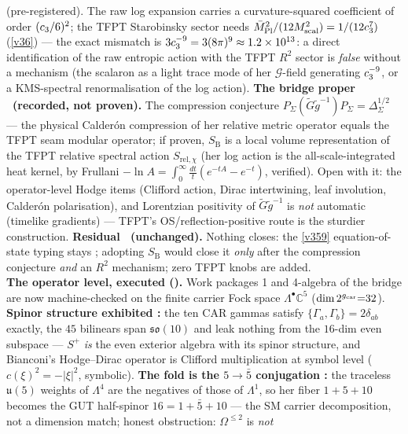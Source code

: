 \begin{keybox}
{(pre-registered).} The raw log expansion carries a curvature-squared coefficient of order
$(c_3/6)^2$; the TFPT Starobinsky sector needs $\bar M_{\mathrm{Pl}}^2/(12M_{\mathrm{scal}}^2)=1/(12c_3^7)$
(\vref{v36}) --- the exact mismatch is $3c_3^{-9}=3(8\pi)^9\approx1.2\times10^{13}$: a direct
identification of the raw entropic action with the TFPT $R^2$ sector is \emph{false} without a mechanism
(the scalaron as a light trace mode of her $\mathcal G$-field generating $c_3^{-9}$, or a KMS-spectral
renormalisation of the log action). \textbf{The bridge proper \mC\ (recorded, not proven).} The compression
conjecture $P_\Sigma(\widetilde G\widetilde g^{-1})P_\Sigma=\Delta_\Sigma^{1/2}$ --- the physical
Calder\'on compression of her relative metric operator equals the TFPT seam modular operator; if proven,
$S_{\mathrm B}$ is a local volume representation of the TFPT relative spectral action
$S_{\mathrm{rel},\chi}$ (her log action is the all-scale-integrated heat kernel, by Frullani
$-\ln A=\int_0^\infty\tfrac{dt}t(e^{-tA}-e^{-t})$, verified). Open with it: the operator-level Hodge items
(Clifford action, Dirac intertwining, leaf involution, Calder\'on polarisation), and Lorentzian positivity
of $\widetilde G\widetilde g^{-1}$ is \emph{not} automatic (timelike gradients) --- TFPT's
OS/reflection-positive route is the sturdier construction. \textbf{Residual \mO\ (unchanged).} Nothing
closes: the \vref{v359} equation-of-state typing stays \mO; adopting $S_{\mathrm B}$ would close it
\emph{only} after the compression conjecture \emph{and} an $R^2$ mechanism; zero TFPT knobs are added.
\smallskip\\
\noindent\textbf{The operator level, executed ().} Work packages
1 and 4-algebra of the bridge are now machine-checked on the finite carrier Fock space
$\Lambda^\bullet\mathbb C^5$ ($\dim 2^{g_{\mathrm{car}}}{=}32$). \textbf{Spinor structure exhibited \mE:} the ten
CAR gammas satisfy $\{\Gamma_a,\Gamma_b\}{=}2\delta_{ab}$ exactly, the $45$ bilinears span
$\mathfrak{so}(10)$ and leak nothing from the $16$-dim even subspace --- $S^+$ \emph{is} the even
exterior algebra with its spinor structure, and Bianconi's Hodge--Dirac operator is Clifford
multiplication at symbol level ($c(\xi)^2{=}-|\xi|^2$, symbolic). \textbf{The fold is the
$5{\to}\bar5$ conjugation \mE:} the traceless $\mathfrak u(5)$ weights of $\Lambda^4$ are the negatives
of those of $\Lambda^1$, so her fiber $1{+}5{+}10$ becomes the GUT half-spinor $16{=}1{+}\bar5{+}10$ ---
the SM carrier decomposition, not a dimension match; honest obstruction: $\Omega^{\le2}$ is \emph{not}

\end{keybox}
